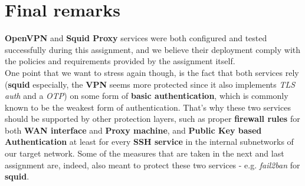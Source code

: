 \section{Final remarks}
\textbf{OpenVPN} and \textbf{Squid Proxy} services were both configured and tested successfully during this assignment, and we believe their deployment comply with the policies and requirements provided by the assignment itself.\\
One point that we want to stress again though, is the fact that both services rely (\textbf{squid} especially, the \textbf{VPN} seems more protected since it also implements \textit{TLS auth} and a \textit{OTP}) on some form of \textbf{basic authentication}, which is commonly known to be the weakest form of authentication. That's why these two services should be supported by other protection layers, such as proper \textbf{firewall rules} for both \textbf{WAN interface} and \textbf{Proxy machine}, and \textbf{Public Key based Authentication} at least for every \textbf{SSH service} in the internal subnetworks of our target network.
Some of the measures that are taken in the next and last assignment are, indeed, also meant to protect these two services - e.g. \textit{fail2ban} for \textbf{squid}.\\
